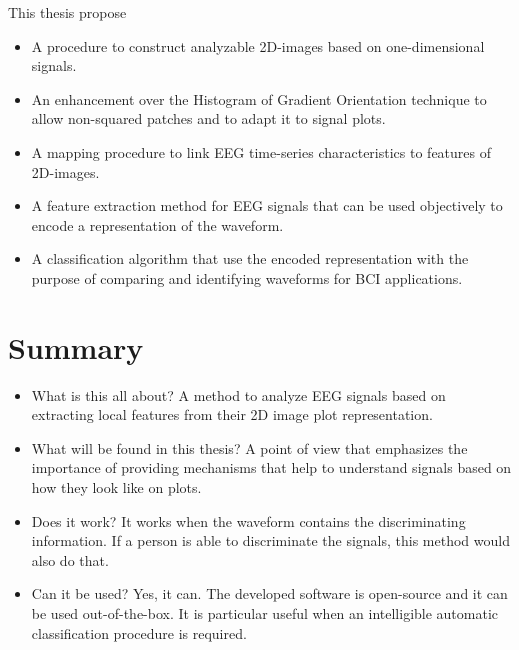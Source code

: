 This thesis propose

\begin{itemize}
\item A procedure to construct analyzable 2D-images based on one-dimensional signals.
\item An enhancement over the Histogram of Gradient Orientation technique to allow non-squared patches and to adapt it to signal plots.
\item A mapping procedure to link EEG time-series characteristics to features of 2D-images.
\item A feature extraction method for EEG signals that can be used objectively to encode a representation of the waveform.
\item A classification algorithm that use the encoded representation with the purpose of comparing and identifying waveforms for BCI applications.
\end{itemize}

\section{Summary}

\begin{itemize}
\item What is this all about? A method to analyze EEG signals based on extracting local features from their 2D image plot representation.
\item What will be found in this thesis? A point of view that emphasizes the importance of providing mechanisms that help to understand signals based on how they look like on plots.
\item Does it work? It works when the waveform contains the discriminating information.  If a person is able to discriminate the signals, this method would also do that.
\item Can it be used?  Yes, it can.  The developed software is open-source and it can be used out-of-the-box.  It is particular useful when an intelligible automatic classification procedure is required.
\end{itemize}



